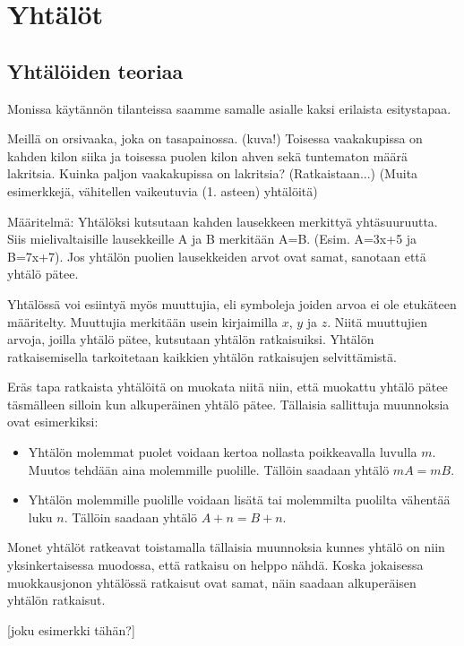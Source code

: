 %
\part{Yhtälöt}
\chapter{Yhtälöiden teoriaa}
Monissa käytännön tilanteissa saamme samalle asialle kaksi erilaista esitystapaa.

\begin{esimerkki}
Meillä on orsivaaka, joka on tasapainossa. (kuva!) Toisessa vaakakupissa on kahden kilon siika ja toisessa puolen kilon ahven sekä tuntematon määrä lakritsia. Kuinka paljon vaakakupissa on lakritsia? (Ratkaistaan...) (Muita esimerkkejä, vähitellen vaikeutuvia (1. asteen) yhtälöitä)
\end{esimerkki}

Määritelmä: Yhtälöksi kutsutaan kahden lausekkeen merkittyä yhtäsuuruutta. Siis mielivaltaisille lausekkeille A ja B merkitään A=B. (Esim. A=3x+5 ja B=7x+7). Jos yhtälön puolien lausekkeiden arvot ovat samat, sanotaan että yhtälö pätee. 

Yhtälössä voi esiintyä myös muuttujia, eli symboleja joiden arvoa ei ole etukäteen määritelty. Muuttujia merkitään usein kirjaimilla $x$, $y$ ja $z$. Niitä muuttujien arvoja, joilla yhtälö pätee, kutsutaan yhtälön ratkaisuiksi. Yhtälön ratkaisemisella tarkoitetaan kaikkien yhtälön ratkaisujen selvittämistä. 

Eräs tapa ratkaista yhtälöitä on muokata niitä niin, että muokattu yhtälö pätee täsmälleen silloin kun alkuperäinen yhtälö pätee. Tällaisia sallittuja muunnoksia ovat esimerkiksi:
\begin{itemize}
\item Yhtälön molemmat puolet voidaan kertoa nollasta poikkeavalla luvulla $m$. Muutos tehdään aina molemmille puolille. Tällöin saadaan yhtälö $mA = mB$.
\item Yhtälön molemmille puolille voidaan lisätä tai molemmilta puolilta vähentää luku $n$.
Tällöin saadaan yhtälö $A+n = B+n$.
\end{itemize}

Monet yhtälöt ratkeavat toistamalla tällaisia muunnoksia kunnes yhtälö on niin yksinkertaisessa muodossa, että ratkaisu on helppo nähdä. Koska jokaisessa muokkausjonon yhtälössä ratkaisut ovat samat, näin saadaan alkuperäisen yhtälön ratkaisut.

[joku esimerkki tähän?]

